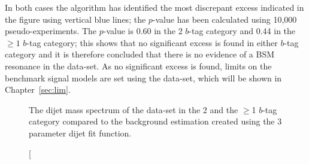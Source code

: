 In both cases the \bh{} algorithm has identified the most discrepant excess indicated
in the figure using vertical blue lines;
the \bh{} \mbox{$p$-value} has been calculated using 10,000 pseudo-experiments.
The \bh{} \mbox{$p$-value} is 0.60 in the 2 $b$-tag category
and 0.44 in the $\geq1$ $b$-tag category;
this shows that no significant excess is found in either $b$-tag category and it is therefore concluded
that there is no evidence of a BSM resonance in the \summer{} data-set.
As no significant excess is found, limits on the benchmark signal models are set using the \summer{} data-set,
which will be shown in Chapter~\ref{sec:lim}.


\begin{figure}[!htb]
  \begin{center}
    \captionsetup[subfigure]{aboveskip=0pt,justification=centering}
  \end{center}
  \vspace{-1em}
  \caption
      [The dijet mass spectrum of the \summer{} data-set in the 2 and the $\geq$1 $b$-tag category
        compared to the background estimation created using the 3 parameter dijet fit function.

\end{figure}

